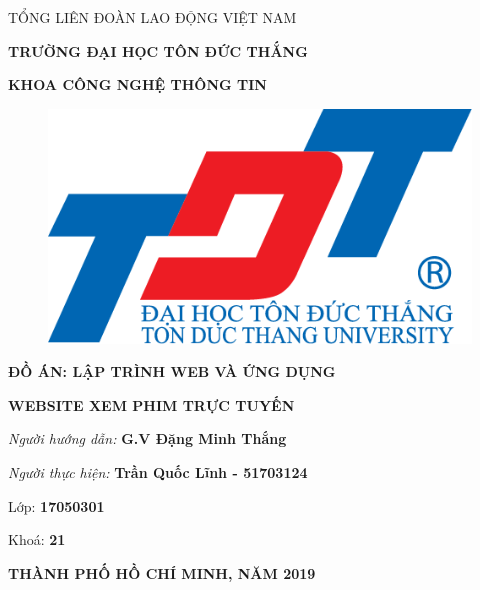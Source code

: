 \documentclass{report}
\begin{document}
\newcommand{\xfill}[2][1ex]{{%
  \dimen0=#2\advance\dimen0 by #1
  \leaders\hrule height \dimen0 depth -#1\hfill%
}}

\changefontsizes[14pt]{12pt}
\centerline{TỔNG LIÊN ĐOÀN LAO ĐỘNG VIỆT NAM}

\changefontsizes[14pt]{11pt}
\centerline{\textbf{TRƯỜNG ĐẠI HỌC TÔN ĐỨC THẮNG}}
\centerline{\textbf{KHOA CÔNG NGHỆ THÔNG TIN}}

\begin{center}
    \begin{figure}[htp]
    \begin{center}
     \includegraphics[scale=.2]{logo}
    \end{center}
    \end{figure}
\end{center}

\changefontsizes{16pt}
\centerline{\textbf{ĐỒ ÁN: LẬP TRÌNH WEB VÀ ỨNG DỤNG}}
\vspace{1.5cm}
\changefontsizes{24pt}
\centerline{\textbf{WEBSITE XEM PHIM TRỰC TUYẾN}}

\vspace{4cm}
\begin{flushright}
\renewcommand{\baselinestretch}{0.05}
\changefontsizes{14pt}
\textit{Người hướng dẫn: }\textbf{G.V Đặng Minh Thắng}
\setlength{\parskip}{0.5em}

\textit{Người thực hiện: }\textbf{Trần Quốc Lĩnh - 51703124}
\setlength{\parskip}{0.5em}

Lớp: \textbf{17050301}
\setlength{\parskip}{0.5em}

Khoá: \textbf{21}
\setlength{\parskip}{0.5em}

\end{flushright}

\vspace{1cm}
\changefontsizes{14pt}
\centerline{\textbf{THÀNH PHỐ HỒ CHÍ MINH, NĂM 2019}}
\end{document}
